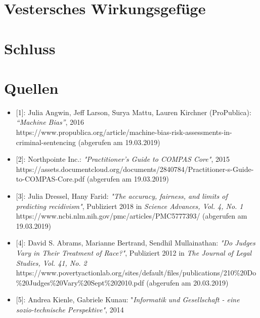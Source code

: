 \documentclass[10pt, a4paper, twocolumn]{article} %
\begin{document}
\section{Vestersches Wirkungsgefüge}


\section{Schluss}

\pagebreak
\section{Quellen}
\begin{itemize}
  \item{[1]}: 
    Julia Angwin, Jeff Larson, Surya Mattu, Lauren Kirchner (ProPublica): \textit{“Machine Bias”}, 2016\\
    https://www.propublica.org/article/machine-bias-risk-assessments-in-criminal-sentencing (abgerufen am 19.03.2019)

  \item{ [2]}: 
    Northpointe Inc.: \textit{"Practitioner’s Guide to COMPAS Core"}, 2015\\
    https://assets.documentcloud.org/documents/2840784/Practitioner-s-Guide-to-COMPAS-Core.pdf (abgerufen am 19.03.2019)

  \item  {[3]}:
    Julia Dressel, Hany Farid: \textit{"The accuracy, fairness, and limits of predicting recidivism"},
    Publiziert 2018 in \textit{Science Advances, Vol. 4, No. 1} \\ 
    https://www.ncbi.nlm.nih.gov/pmc/articles/PMC5777393/  (abgerufen am 19.03.2019)
  \item{[4]}:
    David S. Abrams, Marianne Bertrand, Sendhil Mullainathan: \textit{"Do Judges Vary in Their Treatment of Race?"},
    Publiziert 2012 in \textit{The Journal of Legal Studies, Vol. 41, No. 2} \\
    https://www.povertyactionlab.org/sites/default/files/publications/210\%20Do\%20Judges\%20Vary\%20Sept\%202010.pdf (abgerufen am 20.03.2019)
  \item{[5]}:
    Andrea Kienle, Gabriele Kunau: "\textit{Informatik und Gesellschaft - eine sozio-technische Perspektive"}, 2014
\end{itemize}

\end{document}
